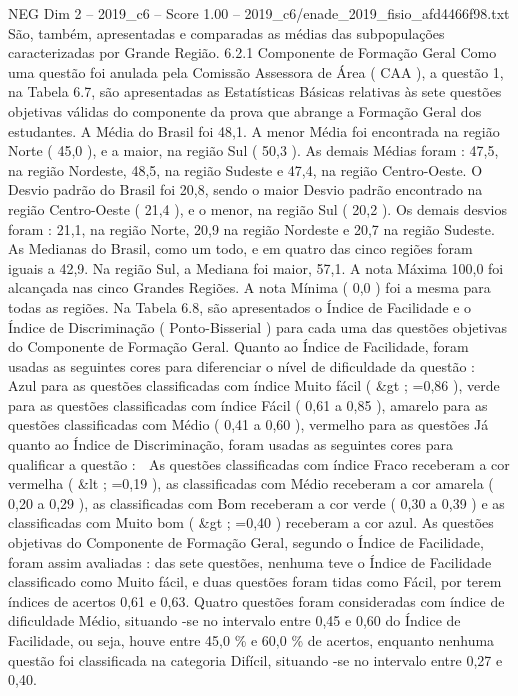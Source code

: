 \begin{textsample}{NEG Dim 2 – 2019\_c6 – Score 1.00 – 2019\_c6/enade\_2019\_fisio\_afd4466f98.txt}
São, também, apresentadas e comparadas as médias das subpopulações caracterizadas por Grande Região. 6.2.1 Componente de Formação Geral Como uma questão foi anulada pela Comissão Assessora de Área ( CAA ), a questão 1, na Tabela 6.7, são apresentadas as Estatísticas Básicas relativas às sete questões objetivas válidas do componente da prova que abrange a Formação Geral dos estudantes.
A Média do Brasil foi 48,1.
A menor Média foi encontrada na região Norte ( 45,0 ), e a maior, na região Sul ( 50,3 ).
As demais Médias foram : 47,5, na região Nordeste, 48,5, na região Sudeste e 47,4, na região Centro-Oeste.
O Desvio padrão do Brasil foi 20,8, sendo o maior Desvio padrão encontrado na região Centro-Oeste ( 21,4 ), e o menor, na região Sul ( 20,2 ).
Os demais desvios foram : 21,1, na região Norte, 20,9 na região Nordeste e 20,7 na região Sudeste.
As Medianas do Brasil, como um todo, e em quatro das cinco regiões foram iguais a 42,9.
Na região Sul, a Mediana foi maior, 57,1.
A nota Máxima 100,0 foi alcançada nas cinco Grandes Regiões.
A nota Mínima ( 0,0 ) foi a mesma para todas as regiões.
Na Tabela 6.8, são apresentados o Índice de Facilidade e o Índice de Discriminação ( Ponto-Bisserial ) para cada uma das questões objetivas do Componente de Formação Geral.
Quanto ao Índice de Facilidade, foram usadas as seguintes cores para diferenciar o nível de dificuldade da questão :  Azul para as questões classificadas com índice Muito fácil ( \&gt ; =0,86 ), verde para as questões classificadas com índice Fácil ( 0,61 a 0,85 ), amarelo para as questões classificadas com Médio ( 0,41 a 0,60 ), vermelho para as questões Já quanto ao Índice de Discriminação, foram usadas as seguintes cores para qualificar a questão :  As questões classificadas com índice Fraco receberam a cor vermelha ( \&lt ; =0,19 ), as classificadas com Médio receberam a cor amarela ( 0,20 a 0,29 ), as classificadas com Bom receberam a cor verde ( 0,30 a 0,39 ) e as classificadas com Muito bom ( \&gt ; =0,40 ) receberam a cor azul.
As questões objetivas do Componente de Formação Geral, segundo o Índice de Facilidade, foram assim avaliadas : das sete questões, nenhuma teve o Índice de Facilidade classificado como Muito fácil, e duas questões foram tidas como Fácil, por terem índices de acertos 0,61 e 0,63.
Quatro questões foram consideradas com índice de dificuldade Médio, situando -se no intervalo entre 0,45 e 0,60 do Índice de Facilidade, ou seja, houve entre 45,0 \% e 60,0 \% de acertos, enquanto nenhuma questão foi classificada na categoria Difícil, situando -se no intervalo entre 0,27 e 0,40.

\end{textsample}
